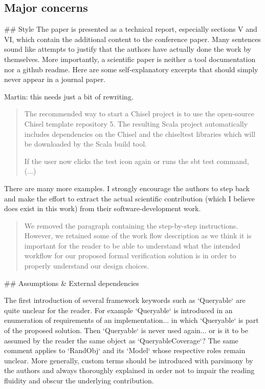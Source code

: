 \documentclass{article}
\newcommand{\martin}[1]{{\color{blue} Martin: #1\\}}
\newcommand{\reply}[1]{{\color{blue} #1}}
\begin{document}
\subsection*{Major concerns}
\#\# Style
The paper is presented as a technical report, especially sections V and VI, which contain the additional content to the conference paper.
Many sentences sound like attempts to justify that the authors have actually done the work by themselves. 
More importantly, a scientific paper is neither a tool documentation nor a github readme.
Here are some self-explanatory excerpts that should simply never appear in a journal paper.

\martin{this needs just a bit of rewriting.}

\begin{quote}
The recommended way to
start a Chisel project is to use the open-source Chisel template
repository 5. The resulting Scala project automatically includes
dependencies on the Chisel and the chiseltest libraries which
will be downloaded by the Scala build tool.

If the user now clicks the test icon again
or runs the sbt test command, (...)
\end{quote}


There are many more examples. 
I strongly encourage the authors to step back and make the effort to extract the actual scientific contribution (which I believe does exist in this work) from their software-development work.

\begin{quote}
\reply{
We removed the paragraph containing the step-by-step instructions. However, we retained some of the work flow description as we think it is important for the reader to be able to understand what
the intended workflow for our proposed formal verification solution is in order to properly understand our design choices.
}
\end{quote}


\#\# Assumptions \& External dependencies

The first introduction of several framework keywords such as `Queryable` are quite unclear for the reader.
For example `Queryable` is introduced in an enumeration of requirements of an implementation... in which `Queryable` is part of the proposed solution.
Then `Queryable` is never used again... or is it to be assumed by the reader the same object as `QueryableCoverage`?
The same comment applies to `RandObj` and its `Model` whose respective roles remain unclear.
More generally, custom terms should be introduced with parsimony by the authors and always thoroughly explained in order not to impair the reading fluidity and obscur the underlying contribution.
\end{document}
